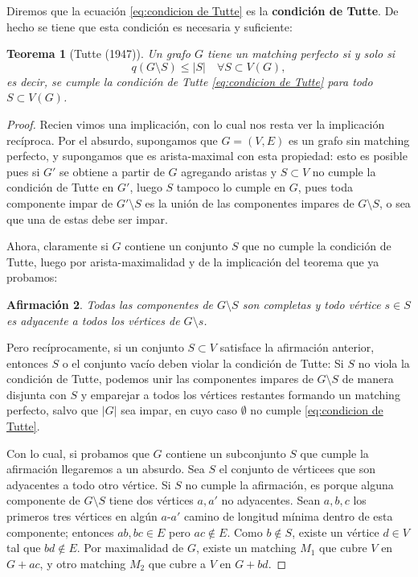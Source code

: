 \documentclass[12pt]{report}
\theoremstyle{plain}
\newtheorem{theorem}{Teorema}[section]
\newtheorem{afirmacion}[theorem]{Afirmación}
\theoremstyle{definition}
\newcommand{\abs}[1]{\left \vert #1 \right \vert}
\begin{document}
Diremos que la ecuación \eqref{eq:condicion de Tutte} es la \textbf{condición de Tutte}. De hecho se tiene que esta condición es necesaria y suficiente:

\begin{theorem}[Tutte (1947)]\label{th:teorema de Tutte}
Un grafo $G$ tiene un matching perfecto si y solo si
\[
q(G\setminus S) \leq \abs S \quad \forall S \subset V(G),
\]
es decir, se cumple la condición de Tutte \eqref{eq:condicion de Tutte} para todo $S \subset V(G)$.
\end{theorem}
\begin{proof}
Recien vimos una implicación, con lo cual nos resta ver la implicación recíproca. Por el absurdo, supongamos que $G= (V,E)$ es un grafo sin matching perfecto, y supongamos que es arista-maximal con esta propiedad: esto es posible pues si $G'$ se obtiene a partir de $G$ agregando aristas y $S \subset V$ no cumple la condición de Tutte en $G'$, luego $S$ tampoco lo cumple en $G$, pues toda componente impar de $G' \setminus S$ es la unión de las componentes impares de $G \setminus S$, o sea que una de estas debe ser impar.

Ahora, claramente si $G$ contiene un conjunto $S$ que no cumple la condición de Tutte, luego por arista-maximalidad y de la implicación del teorema que ya probamos:
\begin{afirmacion}
Todas las componentes de $G \setminus S$ son completas y todo vértice $s \in S$ es adyacente a todos los vértices de $G \setminus s$.
\end{afirmacion}
Pero recíprocamente, si un conjunto $S \subset V$ satisface la afirmación anterior, entonces $S$ o el conjunto vacío deben violar la condición de Tutte: Si $S$ no viola la condición de Tutte, podemos unir las componentes impares de $G \setminus S$ de manera disjunta con $S$ y emparejar a todos los vértices restantes formando un matching perfecto, salvo que $\abs G$ sea impar, en cuyo caso $\emptyset$ no cumple \eqref{eq:condicion de Tutte}.

Con lo cual, si probamos que $G$ contiene un subconjunto $S$ que cumple la afirmación llegaremos a un absurdo. Sea $S$ el conjunto de vérticees que son adyacentes a todo otro vértice. Si $S$ no cumple la afirmación, es porque alguna componente de $G\setminus S$ tiene dos vértices $a,a'$ no adyacentes. Sean $a,b,c$ los primeros tres vértices en algún $a$-$a'$ camino de longitud mínima dentro de esta componente; entonces $ab,bc \in E$ pero $ac \not \in E$. Como $b \not \in S$, existe un vértice $d \in V$ tal que $bd \not \in E$. Por maximalidad de $G$, existe un matching $M_1$ que cubre $V$ en $G+ ac$, y otro matching $M_2$ que cubre a $V$ en $G + bd$.


\end{proof}
\end{document}
